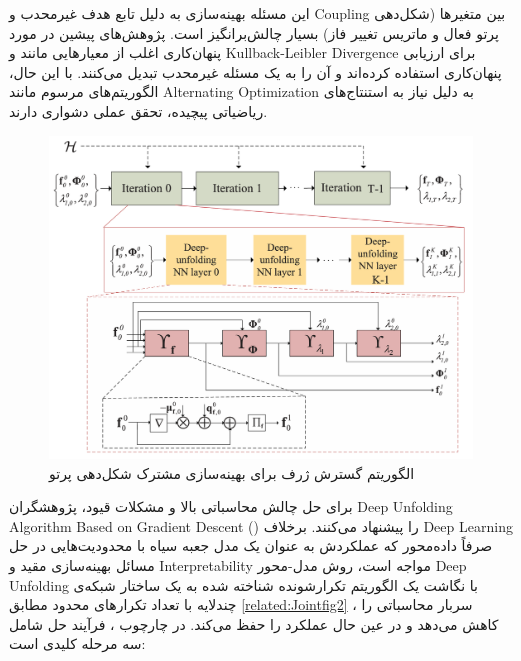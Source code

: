 این مسئله بهینه‌سازی به دلیل تابع هدف غیرمحدب و 
\gls{Coupling}
 بین متغیرها (شکل‌دهی پرتو فعال و ماتریس تغییر فاز) بسیار چالش‌برانگیز است. پژوهش‌های پیشین در مورد پنهان‌کاری اغلب از معیارهایی مانند و 
\gls{Kullback-Leibler Divergence}
  برای ارزیابی پنهان‌کاری استفاده کرده‌اند و آن را به یک مسئله غیرمحدب تبدیل می‌کنند. با این حال، الگوریتم‌های مرسوم مانند 
\gls{Alternating Optimization}
   به دلیل نیاز به استنتاج‌های ریاضیاتی پیچیده، تحقق عملی دشواری دارند.
\begin{figure}
	\centering
	\includegraphics[width=0.6\linewidth]{./Pic/JointActive_related_fig2}
	\caption[ الگوریتم گسترش ژرف برای بهینه‌سازی مشترک شکل‌دهی پرتو]{الگوریتم گسترش ژرف برای بهینه‌سازی مشترک شکل‌دهی پرتو \cite{JointActive}}
	\label{related:Jointfig2}
\end{figure}
برای حل چالش محاسباتی بالا و مشکلات قیود، پژوهشگران 
\gls{Deep Unfolding Algorithm Based on Gradient Descent}
() 
  را پیشنهاد می‌کنند. برخلاف 
 \gls{Deep Learning}
  صرفاً داده‌محور که عملکردش به عنوان یک مدل جعبه سیاه با محدودیت‌هایی در حل مسائل بهینه‌سازی مقید و 
\gls{Interpretability}
  مواجه است، روش مدل-محور
\gls{Deep Unfolding}
  با نگاشت یک الگوریتم تکرارشونده شناخته شده به یک ساختار شبکه‌ی چندلایه با تعداد تکرارهای محدود مطابق
\autoref{related:Jointfig2}
  ، سربار محاسباتی را کاهش می‌دهد و در عین حال عملکرد را حفظ می‌کند.
در چارچوب
،
  فرآیند حل شامل سه مرحله کلیدی است:
